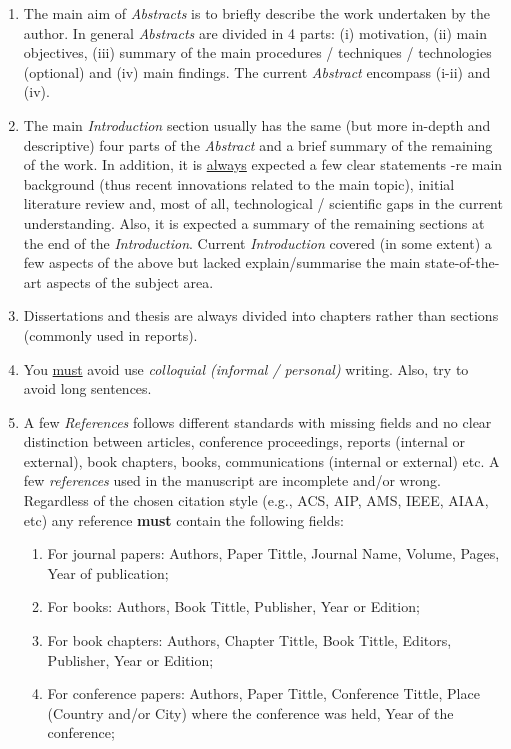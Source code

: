 \documentclass[14pt,twoside]{report}
\begin{document}
\begin{enumerate}
%
\item The main aim of {\it Abstracts} is to briefly describe the work undertaken by the author. In general {\it Abstracts} are divided in 4 parts: (i) motivation, (ii) main objectives, (iii) summary of the main procedures / techniques / technologies (optional) and (iv) main findings. The current {\it Abstract} encompass (i-ii) and (iv). 
%
\item The main {\it Introduction} section usually has the same (but more in-depth and descriptive) four parts of the {\it Abstract} and a brief summary of the remaining of the work. In addition, it is \underline{always} expected a few clear statements -re main background (thus recent innovations related to the main topic), initial literature review and, most of all, technological / scientific gaps in the current understanding. Also, it is expected a summary of the remaining sections at the end of the {\it Introduction}.  Current {\it Introduction} covered (in some extent) a few aspects of the above but lacked explain/summarise the main state-of-the-art aspects of the subject area. 
%
\item Dissertations and thesis are always divided into chapters rather than sections (commonly used in reports).
%
\item You \underline{must} avoid use {\it colloquial (informal / personal)} writing. Also, try to avoid long sentences. 
%
\item A few {\it References} follows different standards with missing fields and no clear distinction between articles, conference proceedings, reports (internal or external), book chapters, books, communications (internal or external) etc.  A few {\it references} used in the manuscript are incomplete and/or wrong. Regardless of the chosen citation style (e.g., ACS, AIP, AMS, IEEE, AIAA, etc) any reference {\bf must} contain the following fields: 
\begin{enumerate}
\item For journal papers: Authors, Paper Tittle, Journal Name, Volume, Pages, Year of publication;
\item For books: Authors, Book Tittle, Publisher, Year or Edition;
\item For book chapters: Authors, Chapter Tittle, Book Tittle, Editors, Publisher, Year or Edition;
\item For conference papers: Authors, Paper Tittle, Conference Tittle, Place (Country and/or City) where the conference was held, Year of the conference;

\end{enumerate}
\end{enumerate}
\end{document}
